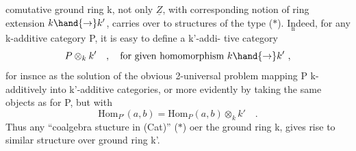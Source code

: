 
comutative ground ring k,  not only $\underline{Z}$,  with corresponding notion of
ring extension $k\hand{\to} k'$,  carries over to structures of the type ($\ast$).
I\(\underset{\text{n}}{\text{n}}\)deed,  for any k-additive category P,  it is easy to define a k'-addi-%
tive category
\[ P\otimes_k k' \quad ,\quad \text{for given homomorphism } k\hand{\to} k' \ , \]
for insnce as the solution of the obvious 2-universal problem  
mapping P k-additively into k'-additive categories, or more evidently
by taking the same objects as for P,  but with
\[ \mathrm{Hom}_{P'}(a,b) = \mathrm{Hom}_{P}(a,b)\otimes_k k' \quad . \]
Thus any ``coalgebra stucture in (Cat)'' ($\ast$) oer the ground ring k,  
gives rise to similar structure over ground ring k'.

